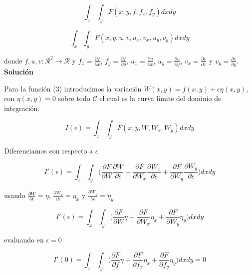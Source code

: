 \documentclass[conference]{IEEEtran}
\begin{document}
\begin{equation}
    \int_x \int_y F(x, y, f, f_x, f_y) dx dy
\end{equation}

\begin{equation}
    \int_x \int_y F(x, y, u, v, u_x, v_x, u_y, v_y) dx dy
\end{equation}

donde $f,u,v: \mathcal{R}^2 \rightarrow \mathcal{R}$ y $f_x = \frac{\partial f}{\partial x}$,
$f_y = \frac{\partial f}{\partial y}$, $u_x = \frac{\partial u}{\partial x}$,
$u_y = \frac{\partial u}{\partial y}$, $v_x = \frac{\partial v}{\partial x}$ y
$v_y = \frac{\partial v}{\partial y}$.\\

\textbf{Solución}

Para la función (3) introducimos la variación $W(x,y) = f(x,y) + \epsilon \eta(x,y)$,
con $\eta(x,y) = 0$ sobre todo $\mathcal{C}$ el cual es la curva límite del dominio de integración.

\begin{equation*}
    I(\epsilon) = \int_x \int_y F(x,y,W,W_x,W_y)dx dy
\end{equation*}

Diferenciamos con respecto a $\epsilon$

\begin{equation*}
    I\prime(\epsilon) = \int_x \int_y \Big(
    \frac{\partial F}{\partial W} \frac{\partial W}{\partial \epsilon}
    + \frac{\partial F}{\partial W_x} \frac{\partial W_x}{\partial \epsilon}
    + \frac{\partial F}{\partial W_y} \frac{\partial W_y}{\partial \epsilon}
    \Big) dx dy
\end{equation*}

usando $\frac{\partial W}{\partial \epsilon} = \eta$,
$\frac{\partial W_x}{\partial \epsilon} = \eta_x$ y
$\frac{\partial W_y}{\partial \epsilon} = \eta_y$

\begin{equation*}
    I\prime(\epsilon) = \int_x \int_y \Big(
    \frac{\partial F}{\partial W} \eta
    + \frac{\partial F}{\partial W_x} \eta_x
    + \frac{\partial F}{\partial W_y} \eta_y
    \Big) dx dy
\end{equation*}

evaluando en $\epsilon=0$

\begin{equation*}
    I\prime(0) = \int_x \int_y \Big(
    \frac{\partial F}{\partial f} \eta
    + \frac{\partial F}{\partial f_x} \eta_x
    + \frac{\partial F}{\partial f_y} \eta_y
    \Big) dx dy = 0
\end{equation*}
\end{document}
